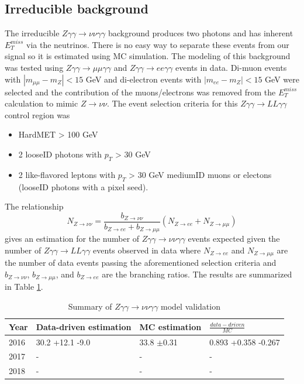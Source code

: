 \subsection{Irreducible background}
The irreducible $Z \gamma \gamma \rightarrow \nu \nu \gamma \gamma$ background produces two photons and has inherent $E^{miss}_T$ via the neutrinos.  There is no easy way to separate these events from our signal so it is estimated using MC simulation.  The modeling of this background was tested using $Z\gamma \gamma \rightarrow \mu \mu \gamma \gamma$ and $Z\gamma \gamma \rightarrow ee \gamma \gamma$ events in data.  Di-muon events with $|m_{\mu \mu} - m_Z|<15$ GeV and di-electron events with $|m_{ee}-m_Z|<15$ GeV were selected and the contribution of the muons/electrons was removed from the $E^{miss}_T$ calculation to mimic $Z\rightarrow \nu \nu$.  The event selection criteria for this $Z \gamma \gamma \rightarrow LL \gamma \gamma$ control region was
\begin{itemize}
	\item HardMET > 100 GeV
	\item 2 looseID photons with $p_T$ > 30 GeV
	\item 2 like-flavored leptons with $p_T$ > 30 GeV
	 mediumID muons or
	 electons (looseID photons with a pixel seed).
\end{itemize}
The relationship
\begin{equation}
	N_{Z\rightarrow \nu \nu} = \frac{b_{Z\rightarrow \nu \nu}}{b_{Z\rightarrow ee}+b_{Z\rightarrow \mu \mu}}(N_{Z\rightarrow ee}+N_{Z\rightarrow \mu \mu})
	\label{equation:zggtonunugg}
\end{equation}
gives an estimation for the number of $Z \gamma \gamma \rightarrow \nu \nu \gamma \gamma$ events expected given the number of $Z \gamma \gamma \rightarrow LL \gamma \gamma$ events observed in data where $N_{Z\rightarrow ee}$ and $N_{Z\rightarrow \mu \mu}$ are the number of data events passing the aforementioned selection criteria and $b_{Z\rightarrow \nu \nu}$, $b_{Z\rightarrow \mu \mu}$, and $b_{Z\rightarrow ee}$ are the branching ratios.  The results are summarized in Table \ref{table:ZGGtonunuGG}.

\begin{table}[h]
	\centering
	\caption{Summary of $Z \gamma \gamma \rightarrow \nu \nu \gamma \gamma$ model validation}
	\begin{tabular}{l|l|l|l}
		\hline
		Year & Data-driven estimation & MC estimation & $\frac{data-driven}{MC}$ \\
		\hline
		\hline
		2016 & 30.2 +12.1 -9.0 & 33.8 $\pm$0.31 & 0.893 +0.358 -0.267 \\
		\hline
		2017 & - & - & - \\
		\hline
		2018 & - & - & - \\
		\hline
	\end{tabular}
	\label{table:ZGGtonunuGG}
\end{table}
